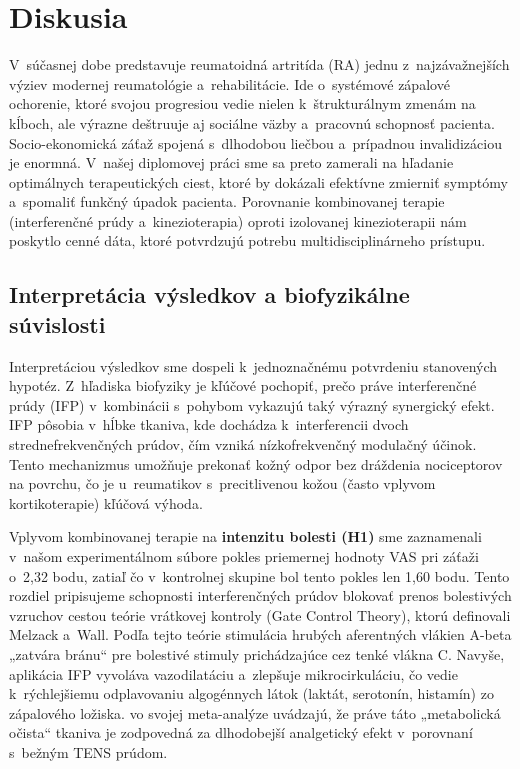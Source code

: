 
\chapter{Diskusia}

V~súčasnej dobe predstavuje reumatoidná artritída (RA) jednu z~najzávažnejších výziev modernej reumatológie a~rehabilitácie. Ide o~systémové zápalové ochorenie, ktoré svojou progresiou vedie nielen k~štrukturálnym zmenám na kĺboch, ale výrazne deštruuje aj sociálne väzby a~pracovnú schopnosť pacienta. Socio-ekonomická záťaž spojená s~dlhodobou liečbou a~prípadnou invalidizáciou je enormná. V~našej diplomovej práci sme sa preto zamerali na hľadanie optimálnych terapeutických ciest, ktoré by dokázali efektívne zmierniť symptómy a~spomaliť funkčný úpadok pacienta. Porovnanie kombinovanej terapie (interferenčné prúdy a~kinezioterapia) oproti izolovanej kinezioterapii nám poskytlo cenné dáta, ktoré potvrdzujú potrebu multidisciplinárneho prístupu.

\section{Interpretácia výsledkov a biofyzikálne súvislosti}

Interpretáciou výsledkov sme dospeli k~jednoznačnému potvrdeniu stanovených hypotéz. Z~hľadiska biofyziky je kľúčové pochopiť, prečo práve interferenčné prúdy (IFP) v~kombinácii s~pohybom vykazujú taký výrazný synergický efekt. IFP pôsobia v~hĺbke tkaniva, kde dochádza k~interferencii dvoch strednefrekvenčných prúdov, čím vzniká nízkofrekvenčný modulačný účinok. Tento mechanizmus umožňuje prekonať kožný odpor bez dráždenia nociceptorov na povrchu, čo je u~reumatikov s~precitlivenou kožou (často vplyvom kortikoterapie) kľúčová výhoda.

Vplyvom kombinovanej terapie na \textbf{intenzitu bolesti (H1)} sme zaznamenali v~našom experimentálnom súbore pokles priemernej hodnoty VAS pri záťaži o~2,32 bodu, zatiaľ čo v~kontrolnej skupine bol tento pokles len 1,60 bodu. Tento rozdiel pripisujeme schopnosti interferenčných prúdov blokovať prenos bolestivých vzruchov cestou teórie vrátkovej kontroly (Gate Control Theory), ktorú definovali Melzack a~Wall. Podľa tejto teórie stimulácia hrubých aferentných vlákien A-beta „zatvára bránu“ pre bolestivé stimuly prichádzajúce cez tenké vlákna C. Navyše, aplikácia IFP vyvoláva vazodilatáciu a~zlepšuje mikrocirkuláciu, čo vedie k~rýchlejšiemu odplavovaniu algogénnych látok (laktát, serotonín, histamín) zo zápalového ložiska. \textcite{Fuentes2010} vo svojej meta-analýze uvádzajú, že práve táto „metabolická očista“ tkaniva je zodpovedná za dlhodobejší analgetický efekt v~porovnaní s~bežným TENS prúdom.

